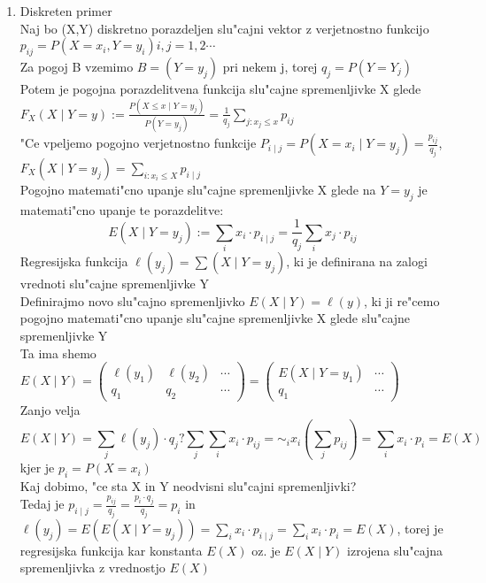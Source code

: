 \documentclass[a4paper,12pt]{article}
\theoremstyle{definition}
\theoremstyle{remark}
\begin{document}
\begin{enumerate}[label=\Alph*]
    \item Diskreten primer \\
        Naj bo (X,Y) diskretno porazdeljen slu"cajni vektor z verjetnostno funkcijo $p_{ij} = P(X=x_i, Y=y_i) i,j = 1, 2 \cdots$ \\
        Za pogoj B vzemimo $B = (Y=y_j)$ pri nekem j, torej $q_j = P(Y=Y_j)$ \\
        Potem je pogojna porazdelitvena funkcija slu"cajne spremenljivke X glede $F_X(X \mid Y=y) :=
        \frac{P(X \leq x \mid Y=y_j)}{P(Y=y_j)} = \frac{1}{q_{j}} \sum_{j: x_j \leq x} p_{ij}$ \\
        "Ce vpeljemo pogojno verjetnostno funkcije $P_{i \mid j} = P(X=x_i \mid Y=y_j) = \frac{p_{ij}}{q_j}$,
        $F_X(X \mid Y=y_j) = \sum_{i: x_i \leq X} p_{i \mid j}$ \\
        Pogojno matemati"cno upanje slu"cajne spremenljivke X glede na $Y=y_j$ je matemati"cno upanje te porazdelitve:
        \[E(X \mid Y=y_j) := \sum_{i} x_i \cdot p_{i \mid j} = \frac{1}{q_j} \sum_{i} x_j \cdot p_{ij} \]    %
        Regresijska funkcija $\ell (y_j) = \sum (X \mid Y=y_j)$, ki je definirana na zalogi vrednoti slu"cajne
        spremenljivke Y \\
        Definirajmo novo slu"cajno spremenljivko $E(X \mid Y) = \ell (y)$, ki ji re"cemo pogojno matemati"cno upanje
        slu"cajne spremenljivke X glede slu"cajne spremenljivke Y \\
        Ta ima shemo $E(X \mid Y) = \begin{pmatrix} \ell (y_1) & \ell (y_2) & \cdots \\ q_1 & q_2 & \cdots
        \end{pmatrix} = \begin{pmatrix} E(X \mid Y=y_1) & \cdots \\ q_1 & \cdots
        \end{pmatrix}$ \\
        Zanjo velja
        \[E(X \mid Y) = \sum_j \ell (y_j) \cdot q_j ? \sum_j \sum_i x_i \cdot p_{ij} = \sim_i x_i (\sum_j p_{ij}) =
        \sum_i x_i \cdot p_i = E(X)\]
        kjer je $p_i = P(X=x_i)$ \\
        Kaj dobimo, "ce sta X in Y neodvisni slu"cajni spremenljivki? \\
        Tedaj je $p_{i \mid j} = \frac{p_{ij}}{q_j} = \frac{p_i \cdot q_j}{q_j} = p_i$ in
        $\ell (y_j) = E(E(X \mid Y=y_j)) = \sum_i x_i \cdot p_{i \mid j} = \sum_i x_i \cdot p_i = E(X)$, torej je
        regresijska funkcija kar konstanta $E(X)$ oz. je $E(X \mid Y)$ izrojena slu"cajna spremenljivka z vrednostjo $E(X)$


\end{enumerate}
\end{document}
